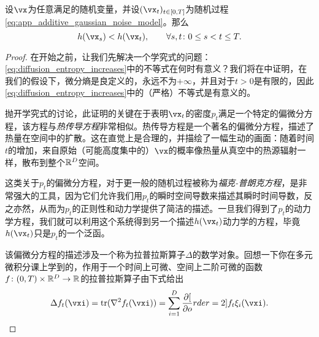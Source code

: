 \documentclass[../../book-main.tex]{subfiles}
\begin{document}
\begin{theorem}[扩散增加熵]\label{thm:diffusion_entropy_increases}
    设\(\vx\)为任意满足的随机变量，并设\((\vx_{t})_{t \in [0, T]}\)为随机过程\eqref{eq:app_additive_gaussian_noise_model}。那么
    \begin{equation}\label{eq:diffusion_entropy_increases}
        h(\vx_{s}) < h(\vx_{t}), \qquad \forall s, t \colon 0 \leq s < t \leq T.
    \end{equation}
\end{theorem}
\begin{proof}
    在开始之前，让我们先解决一个学究式的问题：\eqref{eq:diffusion_entropy_increases}中的不等式在何时有意义？我们将在中证明，在我们的假设下，微分熵是良定义的，永远不为\(+\infty\)，并且对于\(t > 0\)是有限的，因此\eqref{eq:diffusion_entropy_increases}中的（严格）不等式是有意义的。

    抛开学究式的讨论，此证明的关键在于表明\(\vx_{t}\)的密度\(p_{t}\)满足一个特定的偏微分方程，该方程与\textit{热传导方程}非常相似。热传导方程是一个著名的偏微分方程，描述了热量在空间中的扩散。这在直觉上是合理的，并描绘了一幅生动的画面：随着时间\(t\)的增加，来自原始（可能高度集中的）\(\vx\)的概率像热量从真空中的热源辐射一样，散布到整个\(\mathbb{R}^{D}\)空间。
    
    这类关于\(p_{t}\)的偏微分方程，对于更一般的随机过程被称为\textit{福克-普朗克方程}，是非常强大的工具，因为它们允许我们用\(p_{t}\)的瞬时空间导数来描述其瞬时时间导数，反之亦然，从而为\(p_{t}\)的正则性和动力学提供了简洁的描述。一旦我们得到了\(p_{t}\)的动力学方程，我们就可以利用这个系统得到另一个描述\(h(\vx_{t})\)动力学的方程，毕竟\(h(\vx_{t})\)只是\(p_{t}\)的一个泛函。

    该偏微分方程的描述涉及一个称为拉普拉斯算子\(\Delta\)的数学对象。回想一下你在多元微积分课上学到的，作用于一个时间上可微、空间上二阶可微的函数\(f \colon (0, T) \times \mathbb{R}^{D} \to \mathbb{R}\)的拉普拉斯算子由下式给出
    \begin{equation}
        \Delta f_{t}(\vxi) = \tr(\nabla^{2}f_{t}(\vxi)) = \sum_{i = 1}^{D}\pdv[order=2]{f_{t}}{\xi_{i}}(\vxi).
    \end{equation}
    

\end{proof}
\end{document}
